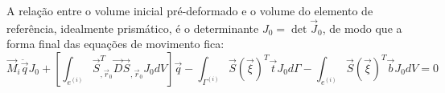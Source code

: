 A relação entre o volume inicial pré-deformado e o volume do elemento de referência, idealmente prismático, é o determinante $J_0=\det{\vec{J}_0}$,
de modo que a forma final das equações de movimento fica:
\begin{equation}
     \vec{M}_i \ddot{\vec{q}} J_0 + 
    \left[ \int_{e^{(i)}}{ \vec{S}_{,\vec{r}_0}^T \vec{D} \vec{S}_{,\vec{r}_0} J_0 dV}\right]\vec{q}
    - \int_{\Gamma^{(i)}}{\vec{S}(\vec{\xi})^T \vec{t} J_0 d\Gamma} 
    - \int_{e^{(i)}}{\vec{S}(\vec{\xi})^T \vec{b} J_0 dV} = 0  \label{eq: eq_mov_final}
\end{equation}